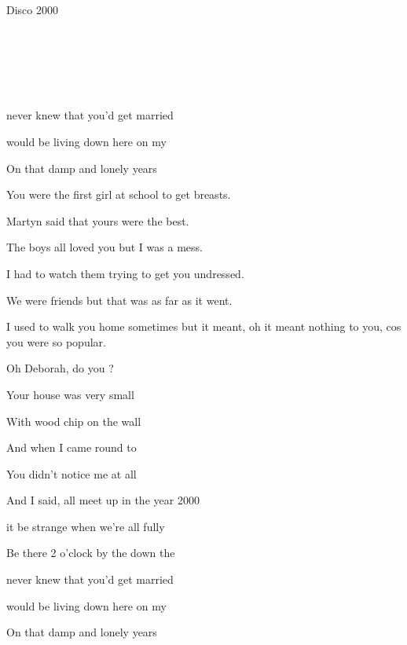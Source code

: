 \begin{song}{Disco 2000}{
	

	\mbox{ \FMaj \FMajsusFour \BMaj \BMajsusFour }	
	

	\mbox{ \FMaj \BFlat }


	\mbox{ \Cm \BFlat \Dm \Gm \FMaj }
	
}
\begin{SongVerse}
		 never knew that you'd get married 
                             
		 would be living down here on my    

		On that damp and lonely  years  
	\end{SongVerse}

	\begin{SongVerse}
		
		You were the first girl at school to get breasts.
		
		Martyn said that yours were the best.
		
		The boys all loved you but I was a mess.
		
		I had to watch them trying to get you undressed.
		
		We were friends but that was as far as it went.
		
		I used to walk you home sometimes but it meant,
		oh it meant nothing to you,
		cos you were so popular.
	\end{SongVerse}
	
	 \begin{SongVerse}	     
	                  
		Oh Deborah, do you ?

		Your house was very small

		With wood chip on the wall
                         
		And when I came round to 

		You didn't notice me at all 		
	 \end{SongVerse}

 \begin{SongVerse}
                          
		And I said,  all meet up in the year 2000
                                        
		 it be strange when we're all fully 
                                          
		Be there 2 o'clock by the  down the 

		 never knew that you'd get married 
                             
		 would be living down here on my    

		On that damp and lonely  years  
	\end{SongVerse}


\end{song}
